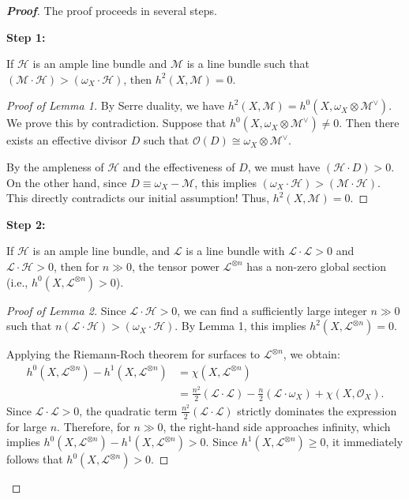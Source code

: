 \begin{proof}[\textbf{Proof}]
The proof proceeds in several steps.

\textbf{Step 1:}
\begin{lemma}
If $\mathcal{H}$ is an ample line bundle and $\mathcal{M}$ is a line bundle such that $(\mathcal{M} \cdot \mathcal{H}) > (\omega_X \cdot \mathcal{H})$, then $h^2(X, \mathcal{M}) = 0$.
\end{lemma}

\begin{proof}[Proof of Lemma 1]
By Serre duality, we have $h^2(X, \mathcal{M}) = h^0(X, \omega_X \otimes \mathcal{M}^\vee)$. We prove this by contradiction. Suppose that $h^0(X, \omega_X \otimes \mathcal{M}^\vee) \neq 0$. Then there exists an effective divisor $D$ such that $\mathcal{O}(D) \cong \omega_X \otimes \mathcal{M}^\vee$. 

By the ampleness of $\mathcal{H}$ and the effectiveness of $D$, we must have $(\mathcal{H} \cdot D) > 0$. On the other hand, since $D \equiv \omega_X - \mathcal{M}$, this implies $(\omega_X \cdot \mathcal{H}) > (\mathcal{M} \cdot \mathcal{H})$. This directly contradicts our initial assumption! Thus, $h^2(X, \mathcal{M}) = 0$.
\end{proof}

\textbf{Step 2:}
\begin{lemma}
If $\mathcal{H}$ is an ample line bundle, and $\mathcal{L}$ is a line bundle with $\mathcal{L} \cdot \mathcal{L} > 0$ and $\mathcal{L} \cdot \mathcal{H} > 0$, then for $n \gg 0$, the tensor power $\mathcal{L}^{\otimes n}$ has a non-zero global section (i.e., $h^0(X, \mathcal{L}^{\otimes n}) > 0$).
\end{lemma}

\begin{proof}[Proof of Lemma 2]
Since $\mathcal{L} \cdot \mathcal{H} > 0$, we can find a sufficiently large integer $n \gg 0$ such that $n(\mathcal{L} \cdot \mathcal{H}) > (\omega_X \cdot \mathcal{H})$. By Lemma 1, this implies $h^2(X, \mathcal{L}^{\otimes n}) = 0$.

Applying the Riemann-Roch theorem for surfaces to $\mathcal{L}^{\otimes n}$, we obtain:
\begin{align*}
h^0(X, \mathcal{L}^{\otimes n}) - h^1(X, \mathcal{L}^{\otimes n}) &= \chi(X, \mathcal{L}^{\otimes n}) \\
&= \frac{n^2}{2}(\mathcal{L} \cdot \mathcal{L}) - \frac{n}{2}(\mathcal{L} \cdot \omega_X) + \chi(X, \mathcal{O}_X).
\end{align*}
Since $\mathcal{L} \cdot \mathcal{L} > 0$, the quadratic term $\frac{n^2}{2}(\mathcal{L} \cdot \mathcal{L})$ strictly dominates the expression for large $n$. Therefore, for $n \gg 0$, the right-hand side approaches infinity, which implies $h^0(X, \mathcal{L}^{\otimes n}) - h^1(X, \mathcal{L}^{\otimes n}) > 0$. Since $h^1(X, \mathcal{L}^{\otimes n}) \geq 0$, it immediately follows that $h^0(X, \mathcal{L}^{\otimes n}) > 0$.
\end{proof}


\end{proof}

